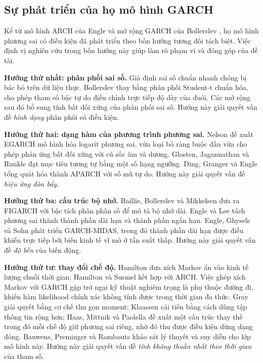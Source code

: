 \documentclass[12pt,a4paper]{article}
\numberwithin{equation}{section}
\theoremstyle{definition}
\begin{document}
\subsection{Sự phát triển của họ mô hình GARCH}\label{subsec:garch-development}
Kể từ mô hình ARCH của Engle \cite{engle1982} và mở rộng GARCH của Bollerslev
\cite{bollerslev1986}, họ mô hình phương sai có điều kiện đã phát triển theo bốn hướng
tương đối tách biệt. Việc định vị nghiên cứu trong bốn hướng này giúp làm rõ phạm vi và
đóng góp của đề tài.

\textbf{Hướng thứ nhất: phân phối sai số.} Giả định sai số chuẩn nhanh chóng bị bác bỏ
trên dữ liệu thực. Bollerslev \cite{bollerslev1987} thay bằng phân phối Student-t chuẩn
hóa, cho phép tham số bậc tự do điều chỉnh trực tiếp độ dày của đuôi. Các mở rộng sau đó
bổ sung tính bất đối xứng của phân phối sai số. Hướng này giải quyết vấn đề \emph{hình
dạng} phân phối có điều kiện.

\textbf{Hướng thứ hai: dạng hàm của phương trình phương sai.} Nelson \cite{nelson1991} đề
xuất EGARCH mô hình hóa logarit phương sai, vừa loại bỏ ràng buộc dấu vừa cho phép phản
ứng bất đối xứng với cú sốc âm và dương. Glosten, Jagannathan và Runkle
\cite{glosten1993} đạt mục tiêu tương tự bằng một số hạng ngưỡng. Ding, Granger và Engle
\cite{ding1993} tổng quát hóa thành APARCH với số mũ tự do. Hướng này giải quyết vấn đề
\emph{hiệu ứng đòn bẩy}.

\textbf{Hướng thứ ba: cấu trúc bộ nhớ.} Baillie, Bollerslev và Mikkelsen
\cite{baillie1996} đưa ra FIGARCH với bậc tích phân phân số để mô tả bộ nhớ dài. Engle và
Lee \cite{engle1999} tách phương sai thành thành phần dài hạn và thành phần ngắn hạn.
Engle, Ghysels và Sohn \cite{engle2013} phát triển GARCH-MIDAS, trong đó thành phần dài
hạn được điều khiển trực tiếp bởi biến kinh tế vĩ mô ở tần suất thấp. Hướng này giải
quyết vấn đề \emph{độ bền} của biến động.

\textbf{Hướng thứ tư: thay đổi chế độ.} Hamilton \cite{hamilton1989} đưa xích Markov ẩn
vào kinh tế lượng chuỗi thời gian; Hamilton và Susmel \cite{hamilton1994} kết hợp với
ARCH. Việc ghép xích Markov với GARCH gặp trở ngại kỹ thuật nghiêm trọng là phụ thuộc
đường đi, khiến hàm likelihood chính xác không tính được trong thời gian đa thức. Gray
\cite{gray1996} giải quyết bằng cơ chế thu gọn moment; Klaassen \cite{klaassen2002} cải
tiến bằng cách dùng tập thông tin rộng hơn; Haas, Mittnik và Paolella \cite{haas2004} đề
xuất một cấu trúc thay thế trong đó mỗi chế độ giữ phương sai riêng, nhờ đó thu được điều
kiện dừng dạng đóng. Bauwens, Preminger và Rombouts \cite{bauwens2010} khảo sát lý thuyết
và suy diễn cho lớp mô hình này. Hướng này giải quyết vấn đề \emph{tính không thuần nhất
theo thời gian} của tham số.
\end{document}
